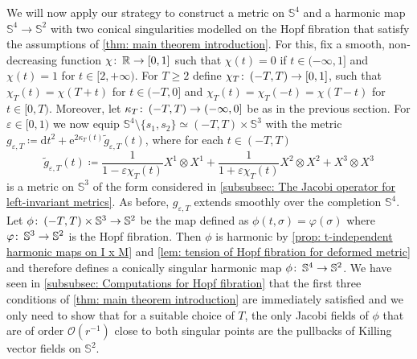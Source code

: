 \documentclass{article}
\numberwithin{equation}{section}        %
\theoremstyle{bfnote}
\theoremstyle{definition}
\theoremstyle{bfremark}
\newcommand{\col}{\colon \thinspace}        %
\newcommand{\R}{\mathbb{R}}                 %
\newcommand{\Sp}{\mathbb{S}}                %
\newcommand{\diff}{\mathrm{d}}                      %
\begin{document}
We will now apply our strategy to construct a metric on $\Sp^4$ and a harmonic map $\Sp^4 \to \Sp^2$ with two conical singularities modelled on the Hopf fibration that satisfy the assumptions of \cref{thm: main theorem introduction}. For this, fix a smooth, non-decreasing function $\chi \col \R \rightarrow [0,1]$ such that $\chi(t) = 0$ if $t \in (-\infty,1]$ and $\chi(t) = 1$ for $t \in [2,+\infty)$. For $T\geq 2$ define $\chi_T \col (-T,T) \rightarrow [0,1]$, such that $\chi_T(t) = \chi(T+t)$ for $t \in (-T,0]$ and $\chi_T(t) = \chi_T(-t) = \chi(T-t)$ for $t \in [0,T)$. Moreover, let $\kappa_T \col (-T,T) \to (-\infty,0]$ be as in the previous section. For $\varepsilon \in [0,1)$ we now equip $\Sp^4 \setminus \{s_1,s_2\} \simeq (-T,T) \times \Sp^3$ with the metric $g_{\varepsilon,T} \coloneqq \diff t^2 + \mathrm{e}^{2\kappa_T(t)} \widetilde{g}_{\varepsilon,T}(t)$, where for each $t \in (-T,T)$
\begin{equation*}
    \widetilde{g}_{\varepsilon,T}(t) \coloneqq \frac{1}{1- \varepsilon \chi_T(t)} X^1 \otimes X^1 + \frac{1}{1+\varepsilon \chi_T(t)} X^2 \otimes X^2 + X^3 \otimes X^3
\end{equation*}
is a metric on $\Sp^3$ of the form considered in \cref{subsubsec: The Jacobi operator for left-invariant metrics}. As before, $g_{\varepsilon,T}$ extends smoothly over the completion $\Sp^4$. Let $\phi \col (-T,T) \times \Sp^3 \rightarrow \Sp^2$ be the map defined as $\phi(t,\sigma) = \varphi(\sigma)$ where $\varphi \col \Sp^3 \rightarrow \Sp^2$ is the Hopf fibration. Then $\phi$ is harmonic by \cref{prop: t-independent harmonic maps on I x M} and \cref{lem: tension of Hopf fibration for deformed metric} and therefore defines a conically singular harmonic map $\phi \col \Sp^4 \to \Sp^2$. We have seen in \cref{subsubsec: Computations for Hopf fibration} that the first three conditions of \cref{thm: main theorem introduction} are immediately satisfied and we only need to show that for a suitable choice of $T$, the only Jacobi fields of $\phi$ that are of order $\mathcal{O}(r^{-1})$ close to both singular points are the pullbacks of Killing vector fields on $\Sp^2$.
\end{document}
